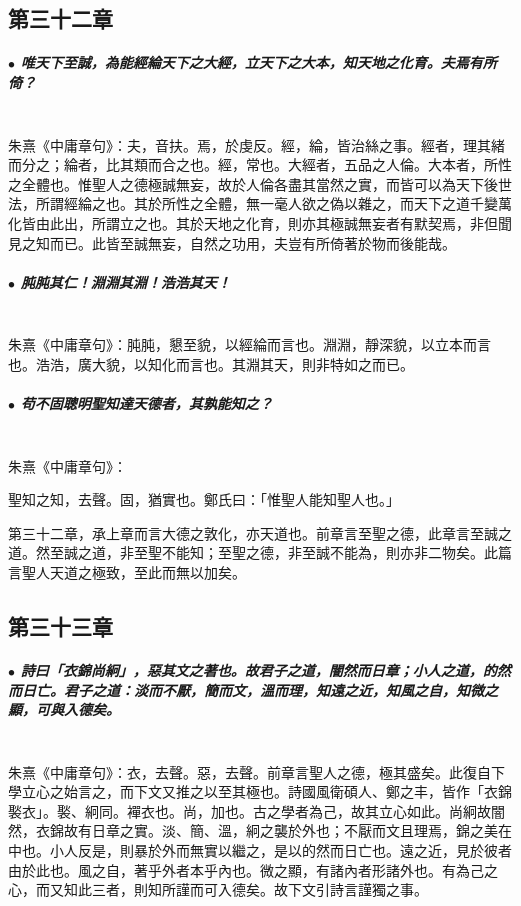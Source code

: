 \documentclass[hyperref, UTF8, 12pt, a4paper]{ctexrep}
\begin{document}
\newpage
\subsection{第三十二章}

\subparagraph{$\bullet$ 唯天下至誠，為能經綸天下之大經，立天下之大本，知天地之化育。夫焉有所倚？} ~\\

朱熹《中庸章句》：夫，音扶。焉，於虔反。經，綸，皆治絲之事。經者，理其緒而分之；綸者，比其類而合之也。經，常也。大經者，五品之人倫。大本者，所性之全體也。惟聖人之德極誠無妄，故於人倫各盡其當然之實，而皆可以為天下後世法，所謂經綸之也。其於所性之全體，無一毫人欲之偽以雜之，而天下之道千變萬化皆由此出，所謂立之也。其於天地之化育，則亦其極誠無妄者有默契焉，非但聞見之知而已。此皆至誠無妄，自然之功用，夫豈有所倚著於物而後能哉。

\subparagraph{$\bullet$ 肫肫其仁！淵淵其淵！浩浩其天！} ~\\

朱熹《中庸章句》：肫肫，懇至貌，以經綸而言也。淵淵，靜深貌，以立本而言也。浩浩，廣大貌，以知化而言也。其淵其天，則非特如之而已。

\subparagraph{$\bullet$ 苟不固聰明聖知達天德者，其孰能知之？} ~\\

朱熹《中庸章句》：

\begin{adjustwidth}{2cm}{1cm}
\indent\indent 聖知之知，去聲。固，猶實也。鄭氏曰：「惟聖人能知聖人也。」

第三十二章，承上章而言大德之敦化，亦天道也。前章言至聖之德，此章言至誠之道。然至誠之道，非至聖不能知；至聖之德，非至誠不能為，則亦非二物矣。此篇言聖人天道之極致，至此而無以加矣。
\end{adjustwidth}

\newpage
\subsection{第三十三章}

\subparagraph{$\bullet$ 詩曰「衣錦尚絅」，惡其文之著也。故君子之道，闇然而日章；小人之道，的然而日亡。君子之道：淡而不厭，簡而文，溫而理，知遠之近，知風之自，知微之顯，可與入德矣。} ~\\

朱熹《中庸章句》：衣，去聲。惡，去聲。前章言聖人之德，極其盛矣。此復自下學立心之始言之，而下文又推之以至其極也。詩國風衛碩人、鄭之丰，皆作「衣錦褧衣」。褧、絅同。襌衣也。尚，加也。古之學者為己，故其立心如此。尚絅故闇然，衣錦故有日章之實。淡、簡、溫，絅之襲於外也；不厭而文且理焉，錦之美在中也。小人反是，則暴於外而無實以繼之，是以的然而日亡也。遠之近，見於彼者由於此也。風之自，著乎外者本乎內也。微之顯，有諸內者形諸外也。有為己之心，而又知此三者，則知所謹而可入德矣。故下文引詩言謹獨之事。
\end{document}
